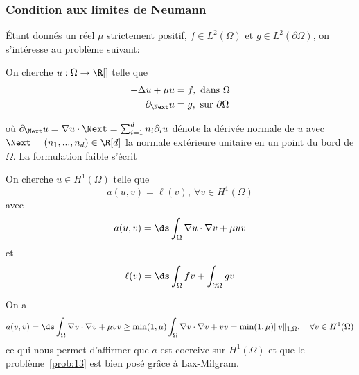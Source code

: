\subsubsection{Condition aux limites de Neumann}
\label{sec:cond-aux-limit-2}

Étant donnés un réel $\mu$ strictement positif, $f \in L^2(\Omega)$ et $g \in
L^2(\partial \Omega)$, on s'intéresse au problème suivant:
\begin{problem}
  \label{prob:9}
  On cherche $u : \Omega \rightarrow \R[]$ telle que
  \begin{equation}
    \label{eq:78}
    \begin{split}
      -\Delta u + \mu u &= f, \mbox{ dans } \Omega\\
      \partial_\Next u &= g, \mbox{ sur } \partial\Omega
    \end{split}
  \end{equation}
\end{problem}
où $\partial_\Next u = \nabla u \cdot \Next = \sum_{i=1}^d n_i \partial_i u$
dénote la dérivée normale de $u$ avec $\Next=(n_1,...,n_d) \in \R[d]$ la
normale extérieure unitaire en un point du bord de $\Omega$.
La formulation faible s'écrit
\begin{problem}
  \label{prob:13}
  On cherche $u \in H^1(\Omega)$ telle que
  \begin{equation}
    \label{eq:79}
    a( u, v ) = \ell(v),\ \forall v \in H^1(\Omega)
  \end{equation}
  avec
  \begin{equation}
    \label{eq:80}
    a( u, v ) = \ds \int_\Omega \nabla u \cdot \nabla v + \mu u v
  \end{equation}
  et
  \begin{equation}
    \label{eq:81}
    \ell( v ) = \ds \int_\Omega f v + \int_{\partial\Omega} g v
  \end{equation}
\end{problem}

On a
\begin{equation}
  \label{eq:82}
  a(v, v) = \ds \int_\Omega \nabla v \cdot \nabla v + \mu v v \ge \min(1,\mu)
  \int_\Omega \nabla v \cdot \nabla v +  v v  = \min(1,\mu) \|v\|_{1,\Omega}, \quad
  \forall v \in H^1(\Omega)
\end{equation}
ce qui nous permet d'affirmer que $a$ est coercive sur $H^1(\Omega)$ et que le
problème~\ref{prob:13} est bien posé grâce à Lax-Milgram.



